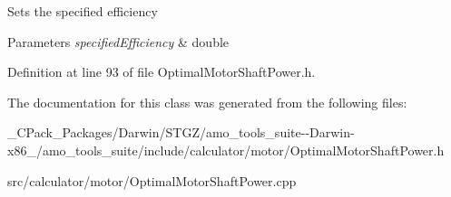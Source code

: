 Sets the specified efficiency 
\begin{DoxyParams}{Parameters}
{\em specified\+Efficiency} & double \\
\hline
\end{DoxyParams}


Definition at line 93 of file Optimal\+Motor\+Shaft\+Power.\+h.



The documentation for this class was generated from the following files\+:\begin{DoxyCompactItemize}
\item 
\+\_\+\+C\+Pack\+\_\+\+Packages/\+Darwin/\+S\+T\+G\+Z/amo\+\_\+tools\+\_\+suite-\/-\/\+Darwin-\/x86\+\_/amo\+\_\+tools\+\_\+suite/include/calculator/motor/Optimal\+Motor\+Shaft\+Power.\+h\item 
src/calculator/motor/Optimal\+Motor\+Shaft\+Power.\+cpp\end{DoxyCompactItemize}
